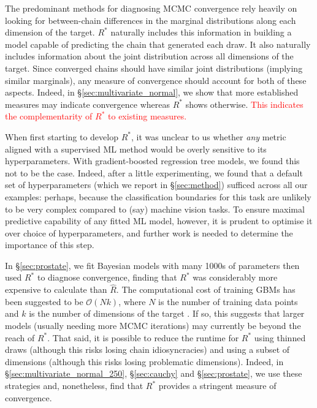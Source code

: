 \documentclass{article}
\begin{document}
The predominant methods for diagnosing MCMC convergence rely heavily on looking for between-chain differences in the marginal distributions along each dimension of the target. $R^*$ naturally includes this information in building a model capable of predicting the chain that generated each draw. It also naturally includes information about the joint distribution across all dimensions of the target. Since converged chains should have similar joint distributions (implying similar marginals), any measure of convergence should account for both of these aspects. Indeed, in \S\ref{sec:multivariate_normal}, we show that more established measures may indicate convergence whereas $R^*$ shows otherwise. \textcolor{red}{This indicates the complementarity of $R^*$ to existing measures.}

When first starting to develop $R^*$, it was unclear to us whether \textit{any} metric aligned with a supervised ML method would be overly sensitive to its hyperparameters. With gradient-boosted regression tree models, we found this not to be the case. Indeed, after a little experimenting, we found that a default set of hyperparameters (which we report in \S\ref{sec:method}) sufficed across all our examples: perhaps, because the classification boundaries for this task are unlikely to be very complex compared to (say) machine vision tasks. To ensure maximal predictive capability of any fitted ML model, however, it is prudent to optimise it over choice of hyperparameters, and further work is needed to determine the importance of this step.

In \S\ref{sec:prostate}, we fit Bayesian models with many 1000s of parameters then used $R^*$ to diagnose convergence, finding that $R^*$ was considerably more expensive to calculate than $\widehat{R}$. The computational cost of training GBMs has been suggested to be $\mathcal{O}(N k)$, where $N$ is the number of training data points and $k$ is the number of dimensions of the target \citep{complexity2018}. If so, this suggests that larger models (usually needing more MCMC iterations) may currently be beyond the reach of $R^*$. That said, it is possible to reduce the runtime for $R^*$ using thinned draws (although this risks losing chain idiosyncracies) and using a subset of dimensions (although this risks losing problematic dimensions). Indeed, in \S\ref{sec:multivariate_normal_250}, \S\ref{sec:cauchy} and \S\ref{sec:prostate}, we use these strategies and, nonetheless, find that $R^*$ provides a stringent measure of convergence.
\end{document}
